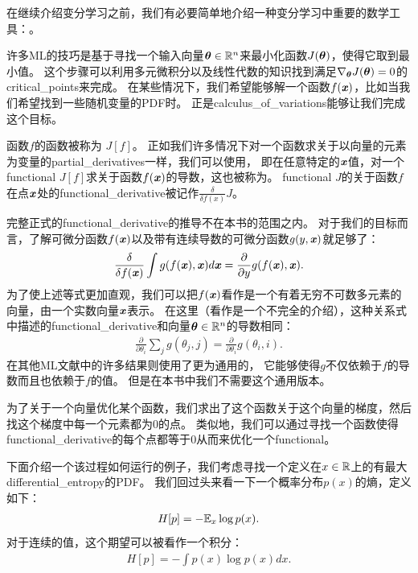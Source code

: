 在继续介绍变分学习之前，我们有必要简单地介绍一种变分学习中重要的数学工具：。


许多\gls{ML}的技巧是基于寻找一个输入向量$\boldsymbol{\theta}\in\mathbb{R}^n$来最小化函数$J(\boldsymbol{\theta})$，使得它取到最小值。
这个步骤可以利用多元微积分以及线性代数的知识找到满足$\nabla_{\boldsymbol{\theta}} J(\boldsymbol{\theta}) = 0$的\gls{critical_points}来完成。
在某些情况下，我们希望能够解一个函数$f(\boldsymbol{\mathit{x}})$，比如当我们希望找到一些随机变量的\gls{PDF}时。
正是\gls{calculus_of_variations}能够让我们完成这个目标。



函数$f$的函数被称为 $J[f]$。
正如我们许多情况下对一个函数求关于以向量的元素为变量的\gls{partial_derivatives}一样，我们可以使用，
即在任意特定的$\boldsymbol{\mathit{x}}$值，对一个\gls{functional} $J[f]$求关于函数$f(\boldsymbol{\mathit{x}})$的导数，这也被称为。
\gls{functional} $J$的关于函数$f$在点$\boldsymbol{\mathit{x}}$处的\gls{functional_derivative}被记作$\frac{\delta}{\delta f(x)}J$。



完整正式的\gls{functional_derivative}的推导不在本书的范围之内。
对于我们的目标而言，了解可微分函数$f(\boldsymbol{\mathit{x}})$以及带有连续导数的可微分函数$g(y,\boldsymbol{\mathit{x}})$就足够了：
\begin{align}
	\frac{\delta}{\delta f(\boldsymbol{\mathit{x}})} \int g(f(\boldsymbol{\mathit{x}}),\boldsymbol{\mathit{x}})d\boldsymbol{\mathit{x}} = \frac{\partial}{\partial y}g(f(\boldsymbol{\mathit{x}}),\boldsymbol{\mathit{x}}).
\end{align}
为了使上述等式更加直观，我们可以把$f(\boldsymbol{\mathit{x}})$看作是一个有着无穷不可数多元素的向量，由一个实数向量$\boldsymbol{\mathit{x}}$表示。
在这里（看作是一个不完全的介绍），这种关系式中描述的\gls{functional_derivative}和向量$\boldsymbol{\theta}\in\mathbb{R}^n$的导数相同：
\begin{align}
	\frac{\partial}{\partial \theta_i}\sum_{j}^{}g(\theta_j,j) = \frac{\partial}{\partial \theta_i}g(\theta_i,i).
\end{align}
在其他\gls{ML}文献中的许多结果则使用了更为通用的，
它能够使得$g$不仅依赖于$f$的导数而且也依赖于$f$的值。
但是在本书中我们不需要这个通用版本。


为了关于一个向量优化某个函数，我们求出了这个函数关于这个向量的梯度，然后找这个梯度中每一个元素都为$0$的点。
类似地，我们可以通过寻找一个函数使得\gls{functional_derivative}的每个点都等于$0$从而来优化一个\gls{functional}。


下面介绍一个该过程如何运行的例子，我们考虑寻找一个定义在$x\in\mathbb{R}$上的有最大\gls{differential_entropy}的\gls{PDF}。
我们回过头来看一下一个概率分布$p(x)$的熵，定义如下：
\begin{align}
	H[p] = - \mathbb{E}_x \log p(x).
\end{align}
对于连续的值，这个期望可以被看作一个积分：
\begin{align}
	H[p] = - \int p(x) \log p(x) dx.
\end{align}


